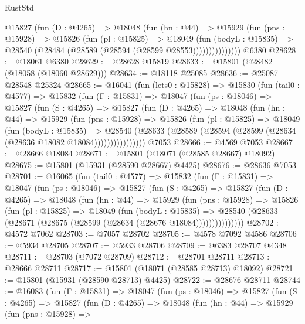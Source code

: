\begin{lexlean}{RustStd}
\begin{coremodule}
              @15827
                (fun (D : @4265) =>
                @18048
                  (fun (hn : @44) =>
                  @15929
                    (fun (pns : @15928) =>
                    @15826
                      (fun (pl : @15825) =>
                      @18049
                        (fun (bodyL : @15835) =>
                        @28540 (@28484 (@28589 (@28594 (@28599 @28553)))))))))))))))
    @6380
@28628 := @18061 @6380
@28629 := @28628 @15819
@28633 := @15801 (@28482 (@18058 (@18060 @28629)))
@28634 := @18118 @25085
@28636 := @25087 @28548 @25324
@28665 := @16041
    (fun (lets0 : @15828) =>
    @15830
      (fun (tail0 : @4577) =>
      @15832
        (fun (Γ : @15831) =>
        @18047
          (fun (ps : @18046) =>
          @15827
            (fun (S : @4265) =>
            @15827
              (fun (D : @4265) =>
              @18048
                (fun (hn : @44) =>
                @15929
                  (fun (pns : @15928) =>
                  @15826
                    (fun (pl : @15825) =>
                    @18049
                      (fun (bodyL : @15835) =>
                      @28540
                        (@28633
                          (@28589 (@28594 (@28599 (@28634 (@28636 @18082 @18084))))))))))))))))
    @7053
@28666 := @4569 @7053
@28667 := @28666 @18084
@28671 := @15801 (@18071 (@28585 @28667) @18092)
@28675 := @15801 (@15931 (@28590 @28667) @4425)
@28676 := @28636 @7053
@28701 := @16065
    (fun (tail0 : @4577) =>
    @15832
      (fun (Γ : @15831) =>
      @18047
        (fun (ps : @18046) =>
        @15827
          (fun (S : @4265) =>
          @15827
            (fun (D : @4265) =>
            @18048
              (fun (hn : @44) =>
              @15929
                (fun (pns : @15928) =>
                @15826
                  (fun (pl : @15825) =>
                  @18049
                    (fun (bodyL : @15835) =>
                    @28540 (@28633 (@28671 (@28675 (@28599 (@28634 (@28676 @18084)))))))))))))))
@28702 := @4572 @7062
@28703 := @7057 @28702
@28705 := @4578 @7092 @4586
@28706 := @5934 @28705
@28707 := @5933 @28706
@28709 := @6383 @28707 @4348
@28711 := @28703 (@7072 @28709)
@28712 := @28701 @28711
@28713 := @28666 @28711
@28717 := @15801 (@18071 (@28585 @28713) @18092)
@28721 := @15801 (@15931 (@28590 @28713) @4425)
@28722 := @28676 @28711
@28744 := @16083
    (fun (Γ : @15831) =>
    @18047
      (fun (ps : @18046) =>
      @15827
        (fun (S : @4265) =>
        @15827
          (fun (D : @4265) =>
          @18048
            (fun (hn : @44) =>
            @15929
              (fun (pns : @15928) =>

\end{coremodule}
\end{lexlean}
